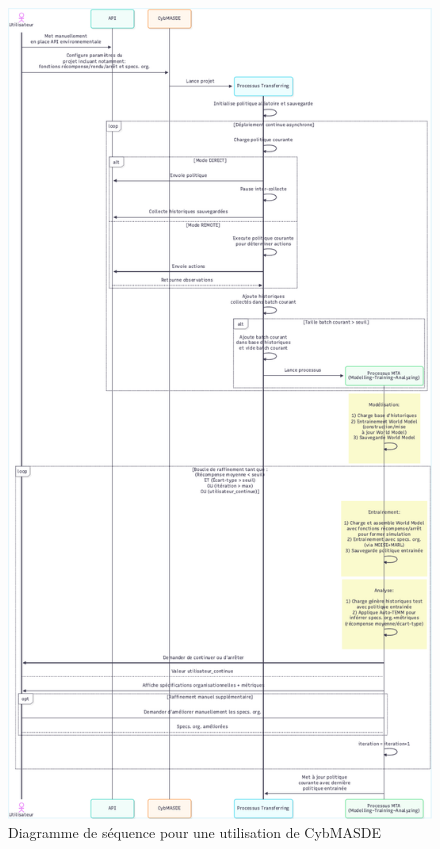\begin{figure}
    \includegraphics[trim={5cm 1cm 5cm 1cm},clip,height=\textheight]{figures/diagramme_sequence_CybMASDE.pdf}
    \caption{Diagramme de séquence pour une utilisation de CybMASDE}
    \label{fig:cybmasde_sequence}
\end{figure}

